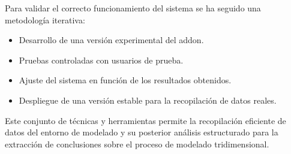 Para validar el correcto funcionamiento del sistema se ha seguido una metodología iterativa:

\begin{itemize}
    \item Desarrollo de una versión experimental del addon.
    \item Pruebas controladas con usuarios de prueba.
    \item Ajuste del sistema en función de los resultados obtenidos.
    \item Despliegue de una versión estable para la recopilación de datos reales.
\end{itemize}

Este conjunto de técnicas y herramientas permite la recopilación eficiente de datos del entorno de modelado y su posterior análisis estructurado para la extracción de conclusiones sobre el proceso de modelado tridimensional.
